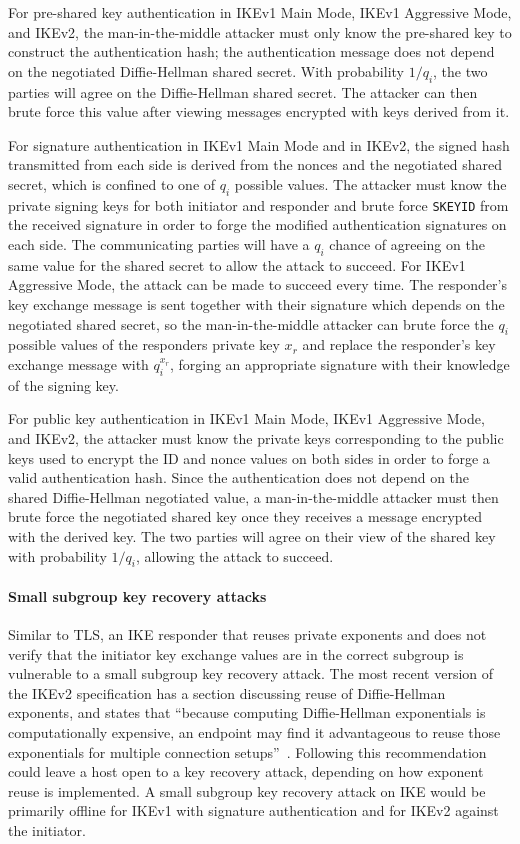 For pre-shared key authentication in IKEv1 Main Mode, IKEv1 Aggressive Mode,
and IKEv2, the man-in-the-middle attacker must only know the pre-shared key to
construct the authentication hash; the authentication message does not depend
on the negotiated Diffie-Hellman shared secret. With probability $1/q_i$, the
two parties will agree on the Diffie-Hellman shared secret. The attacker can
then brute force this value after viewing messages encrypted with keys derived
from it.

For signature authentication in IKEv1 Main Mode and in IKEv2, the signed hash
transmitted from each side is derived from the nonces and the negotiated shared
secret, which is confined to one of $q_i$ possible values.  The attacker must
know the private signing keys for both initiator and responder and brute force
\texttt{SKEYID} from the received signature in order to forge the modified
authentication signatures on each side. The communicating parties will have a
$q_i$ chance of agreeing on the same value for the shared secret to allow the
attack to succeed. For IKEv1 Aggressive Mode, the attack can be made to succeed
every time. The responder's key exchange message is sent together with their
signature which depends on the negotiated shared secret, so the
man-in-the-middle attacker can brute force the $q_i$ possible values of the
responders private key $x_r$ and replace the responder's key exchange message
with $q_i^{x_r}$, forging an appropriate signature with their knowledge of the
signing key.

For public key authentication in IKEv1 Main Mode, IKEv1 Aggressive Mode, and
IKEv2, the attacker must know the private keys corresponding to the public keys
used to encrypt the ID and nonce values on both sides in order to forge a valid
authentication hash.  Since the authentication does not depend on the shared
Diffie-Hellman negotiated value, a man-in-the-middle attacker must then brute
force the negotiated shared key once they receives a message encrypted with the
derived key.  The two parties will agree on their view of the shared key with
probability $1/q_i$, allowing the attack to succeed.

\paragraph{Small subgroup key recovery attacks} Similar to TLS, an IKE
responder that reuses private exponents and does not verify that the initiator
key exchange values are in the correct subgroup is vulnerable to a small
subgroup key recovery attack. The most recent version of the IKEv2
specification has a section discussing reuse of Diffie-Hellman exponents,
and states that ``because computing Diffie-Hellman exponentials is
computationally expensive, an endpoint may find it advantageous to reuse those
exponentials for multiple connection setups''~\cite{rfc7296}. Following this
recommendation could leave a host open to a key recovery attack, depending on
how exponent reuse is implemented. A small subgroup key recovery attack on IKE
would be primarily offline for IKEv1 with signature authentication and for
IKEv2 against the initiator.

